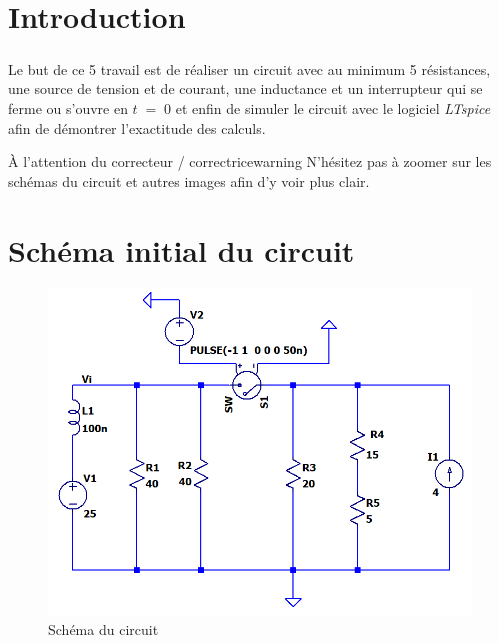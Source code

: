 \section{Introduction}

    \subparagraph{}Le but de ce {\color{info}5\ieme{} travail} est de réaliser un circuit avec au minimum 5 résistances,
    une source de tension et de courant, une inductance et un interrupteur qui se ferme ou s'ouvre en $t\; =\; 0$ et enfin
    de simuler le circuit avec le logiciel \textit{LTspice} afin de démontrer l'exactitude des calculs.\\[1.5cm]
    
    \begin{titletbox}{À l'attention du correcteur / correctrice}{warning}
        N'hésitez pas à zoomer sur les schémas du circuit et autres images afin d'y voir plus clair.
    \end{titletbox}

\section{Schéma initial du circuit}

    \begin{figure}[H]
        \centering
        \includegraphics[scale=0.5]{../pictures/circuit.png} %
        \caption{Schéma du circuit}
    \end{figure}

